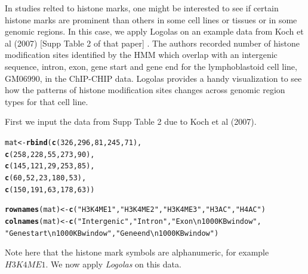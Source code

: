 \documentclass[12pt]{article}\usepackage[]{graphicx}\usepackage[usenames,dvipsnames]{color}
\makeatletter
\newcommand{\hlnum}[1]{\textcolor[rgb]{0.686,0.059,0.569}{#1}}%
\newcommand{\hlstr}[1]{\textcolor[rgb]{0.192,0.494,0.8}{#1}}%
\newcommand{\hlstd}[1]{\textcolor[rgb]{0.345,0.345,0.345}{#1}}%
\newcommand{\hlkwb}[1]{\textcolor[rgb]{0.69,0.353,0.396}{#1}}%
\newcommand{\hlkwd}[1]{\textcolor[rgb]{0.737,0.353,0.396}{\textbf{#1}}}%
\newenvironment{kframe}{%
 \def\at@end@of@kframe{}%
 \ifinner\ifhmode%
  \def\at@end@of@kframe{\end{minipage}}%
  \begin{minipage}{\columnwidth}%
 \fi\fi%
 \def\FrameCommand##1{\hskip\@totalleftmargin \hskip-\fboxsep
 \colorbox{shadecolor}{##1}\hskip-\fboxsep
     \hskip-\linewidth \hskip-\@totalleftmargin \hskip\columnwidth}%
 \MakeFramed {\advance\hsize-\width
   \@totalleftmargin\z@ \linewidth\hsize
   \@setminipage}}%
 {\par\unskip\endMakeFramed%
 \at@end@of@kframe}
\newenvironment{knitrout}{}{} %
\newcommand{\Logolas}{\textit{Logolas}}
\makeatother
\begin{document}
In studies relted to histone marks, one might be interested to see if certain histone marks are prominent than others in some cell lines or tissues or in some genomic regions. In this case, we apply Logolas on an example data from Koch et al (2007) [Supp Table 2 of that paper] \cite{Koch2007}. The authors recorded number of histone modification sites identified by the HMM which overlap with an intergenic sequence, intron, exon, gene start and gene end for the lymphoblastoid cell line, GM06990, in the ChIP-CHIP data. Logolas provides a handy visualization to see how the patterns of histone modification sites changes across genomic region types for that cell line.

First we input the data from Supp Table 2 due to Koch et al (2007).

\begin{knitrout}
\color{fgcolor}\begin{kframe}
\begin{alltt}
\hlstd{mat} \hlkwb{<-} \hlkwd{rbind}\hlstd{(}\hlkwd{c}\hlstd{(}\hlnum{326}\hlstd{,} \hlnum{296}\hlstd{,} \hlnum{81}\hlstd{,} \hlnum{245}\hlstd{,} \hlnum{71}\hlstd{),}
             \hlkwd{c}\hlstd{(}\hlnum{258}\hlstd{,} \hlnum{228}\hlstd{,} \hlnum{55}\hlstd{,} \hlnum{273}\hlstd{,} \hlnum{90}\hlstd{),}
             \hlkwd{c}\hlstd{(}\hlnum{145}\hlstd{,} \hlnum{121}\hlstd{,} \hlnum{29}\hlstd{,} \hlnum{253}\hlstd{,} \hlnum{85}\hlstd{),}
             \hlkwd{c}\hlstd{(}\hlnum{60}\hlstd{,} \hlnum{52}\hlstd{,} \hlnum{23}\hlstd{,} \hlnum{180}\hlstd{,} \hlnum{53}\hlstd{),}
             \hlkwd{c}\hlstd{(}\hlnum{150}\hlstd{,} \hlnum{191}\hlstd{,} \hlnum{63}\hlstd{,} \hlnum{178}\hlstd{,} \hlnum{63}\hlstd{))}

\hlkwd{rownames}\hlstd{(mat)} \hlkwb{<-} \hlkwd{c}\hlstd{(}\hlstr{"H3K4ME1"}\hlstd{,} \hlstr{"H3K4ME2"}\hlstd{,} \hlstr{"H3K4ME3"}\hlstd{,} \hlstr{"H3AC"}\hlstd{,} \hlstr{"H4AC"}\hlstd{)}
\hlkwd{colnames}\hlstd{(mat)} \hlkwb{<-} \hlkwd{c}\hlstd{(}\hlstr{"Intergenic"}\hlstd{,}\hlstr{"Intron"}\hlstd{,}\hlstr{"Exon \textbackslash{}n 1000 KB window"}\hlstd{,}
                   \hlstr{"Gene start \textbackslash{}n 1000 KB window"}\hlstd{,}\hlstr{"Gene end \textbackslash{}n 1000 KB window"}\hlstd{)}
\end{alltt}
\end{kframe}
\end{knitrout}

Note here that the histone mark symbols are alphanumeric, for example $H3K4ME1$.
We now apply \Logolas{} on this data.
\end{document}
